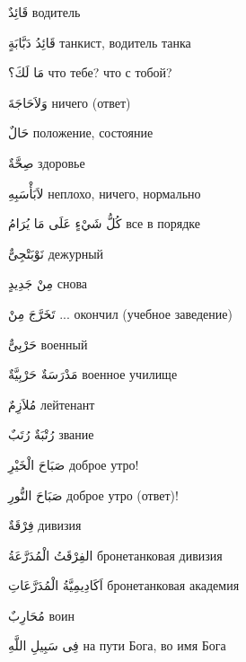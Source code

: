\documentclass[a5paper]{article}
\newcommand\textstyleDropCaps[1]{#1}
\newcommand\textstyleCaptioncharacters[1]{#1}
\begin{document}
\textstyleCaptioncharacters{قَائِدٌ }\textstyleDropCaps{водитель‎}

\textstyleCaptioncharacters{قَائِدُ دَبَّابَةٍ }\textstyleDropCaps{танкист, во­дитель танка‎}

\textstyleCaptioncharacters{مَا لَكَ؟ }\textstyleDropCaps{что тебе? что с то­бой?‎}

\textstyleCaptioncharacters{وَلاَحَاجَةَ }\textstyleDropCaps{ничего (ответ)‎}

\textstyleCaptioncharacters{حَالٌ }\textstyleDropCaps{положение, состоя­ние‎}

\textstyleCaptioncharacters{صِحَّةٌ }\textstyleDropCaps{здоровье‎}

\textstyleCaptioncharacters{لاَبَأْسَبِهِ }\textstyleDropCaps{неплохо, ничего, нормально‎}

\textstyleCaptioncharacters{كُلُّ شَيْءٍ عَلَى مَا يُرَامُ }\textstyleDropCaps{все в порядке‎}

\textstyleCaptioncharacters{نَوْبَتْجِىٌّ }\textstyleDropCaps{дежурный‎}

\textstyleCaptioncharacters{مِنْ جَدِيدٍ }\textstyleDropCaps{снова‎}

\textstyleCaptioncharacters{تَخَرَّجَ مِنْ ...ِ }\textstyleDropCaps{окончил (учебное заведение)‎}

\textstyleCaptioncharacters{حَرْبِىٌّ }\textstyleDropCaps{военный‎}

\textstyleCaptioncharacters{مَدْرَسَةٌ حَرْبِيَّةٌ }\textstyleDropCaps{военное училище‎}

\textstyleCaptioncharacters{مُلاَزِمٌ }\textstyleDropCaps{лейтенант‎}

\textstyleCaptioncharacters{رُتْبَةٌ رُتَبٌ }\textstyleDropCaps{звание‎}

\textstyleCaptioncharacters{صَبَاحَ الْخَيْرِ }\textstyleDropCaps{доброе утро!‎}

\textstyleCaptioncharacters{صَبَاحَ النُّورِ }\textstyleDropCaps{доброе утро (ответ)!‎}

\textstyleCaptioncharacters{فِرْقَةٌ }\textstyleDropCaps{дивизия‎}

\textstyleCaptioncharacters{الفِرْقَتُ الْمُدَرَّعَةُ }\textstyleDropCaps{бро­нетанковая дивизия‎}

\textstyleCaptioncharacters{اَكَادِيمِيَّةُ الْمُدَرَّعَاتِ }\textstyleDropCaps{бронетанковая академия‎}

\textstyleCaptioncharacters{مُحَارِبٌ }\textstyleDropCaps{воин‎}

\textstyleCaptioncharacters{فِى سَبِيلِ اللَّهِ }\textstyleDropCaps{на пути Бога, во имя Бога‎}
\end{document}
